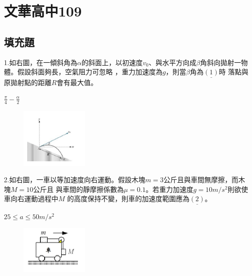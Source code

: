 \documentclass[cn,10pt,math=newtx]{elegantbook}
\begin{document}
\chapter{文華高中109}
\section{填充題}

\begin{example}
   1.如右圖，在一傾斜角為$\alpha$的斜面上，以初速度$v_0$、與水平方向成$\beta$角斜向拋射一物體。假設斜面夠長，空氣阻力可忽略 ，重力加速度為$g$，則當$\beta$角為$\underline{  (1)  }$時 落點與原拋射點的距離$R$會有最大值。\\
    \rightline{[文華高中教甄109]}
\end{example}
\begin{solution}
    $\frac{\pi} {4}-\frac{\alpha} {2}$
\end{solution}
\begin{figure}[htbp]
    \flushright
    \includegraphics[width=0.3\textwidth]{image/109文華1.png}
  \end{figure}
\newpage


\begin{example}
   2.如右圖，一車以等加速度向右運動。假設木塊$m=3$公斤且與車間無摩擦，而木塊$ M =10 公斤$且 與車間的靜摩擦係數為$\mu=0.1$。若重力加速度$g=10m/s^2$則欲使車向右運動過程中$M$ 的高度保持不變，則車的加速度範圍應為$\underline{(2)}$。
   \\
    \rightline{[文華高中教甄109]}
\end{example}
\begin{solution}
    $25\le a \le 50  m/s^2 $
\end{solution}
\begin{figure}[htbp]
    \flushright
    \includegraphics[width=0.3\textwidth]{image/109文華2.png}
  \end{figure}
\newpage
\end{document}
